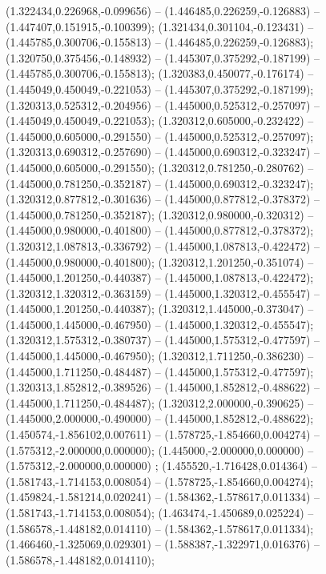  (1.322434,0.226968,-0.099656) -- (1.446485,0.226259,-0.126883) -- (1.447407,0.151915,-0.100399);
 (1.321434,0.301104,-0.123431) -- (1.445785,0.300706,-0.155813) -- (1.446485,0.226259,-0.126883);
 (1.320750,0.375456,-0.148932) -- (1.445307,0.375292,-0.187199) -- (1.445785,0.300706,-0.155813);
 (1.320383,0.450077,-0.176174) -- (1.445049,0.450049,-0.221053) -- (1.445307,0.375292,-0.187199);
 (1.320313,0.525312,-0.204956) -- (1.445000,0.525312,-0.257097) -- (1.445049,0.450049,-0.221053);
 (1.320312,0.605000,-0.232422) -- (1.445000,0.605000,-0.291550) -- (1.445000,0.525312,-0.257097);
 (1.320313,0.690312,-0.257690) -- (1.445000,0.690312,-0.323247) -- (1.445000,0.605000,-0.291550);
 (1.320312,0.781250,-0.280762) -- (1.445000,0.781250,-0.352187) -- (1.445000,0.690312,-0.323247);
 (1.320312,0.877812,-0.301636) -- (1.445000,0.877812,-0.378372) -- (1.445000,0.781250,-0.352187);
 (1.320312,0.980000,-0.320312) -- (1.445000,0.980000,-0.401800) -- (1.445000,0.877812,-0.378372);
 (1.320312,1.087813,-0.336792) -- (1.445000,1.087813,-0.422472) -- (1.445000,0.980000,-0.401800);
 (1.320312,1.201250,-0.351074) -- (1.445000,1.201250,-0.440387) -- (1.445000,1.087813,-0.422472);
 (1.320312,1.320312,-0.363159) -- (1.445000,1.320312,-0.455547) -- (1.445000,1.201250,-0.440387);
 (1.320312,1.445000,-0.373047) -- (1.445000,1.445000,-0.467950) -- (1.445000,1.320312,-0.455547);
 (1.320312,1.575312,-0.380737) -- (1.445000,1.575312,-0.477597) -- (1.445000,1.445000,-0.467950);
 (1.320312,1.711250,-0.386230) -- (1.445000,1.711250,-0.484487) -- (1.445000,1.575312,-0.477597);
 (1.320313,1.852812,-0.389526) -- (1.445000,1.852812,-0.488622) -- (1.445000,1.711250,-0.484487);
 (1.320312,2.000000,-0.390625) -- (1.445000,2.000000,-0.490000) -- (1.445000,1.852812,-0.488622);
 (1.450574,-1.856102,0.007611) -- (1.578725,-1.854660,0.004274) -- (1.575312,-2.000000,0.000000);
 (1.445000,-2.000000,0.000000) -- (1.575312,-2.000000,0.000000) ;
 (1.455520,-1.716428,0.014364) -- (1.581743,-1.714153,0.008054) -- (1.578725,-1.854660,0.004274);
 (1.459824,-1.581214,0.020241) -- (1.584362,-1.578617,0.011334) -- (1.581743,-1.714153,0.008054);
 (1.463474,-1.450689,0.025224) -- (1.586578,-1.448182,0.014110) -- (1.584362,-1.578617,0.011334);
 (1.466460,-1.325069,0.029301) -- (1.588387,-1.322971,0.016376) -- (1.586578,-1.448182,0.014110);
